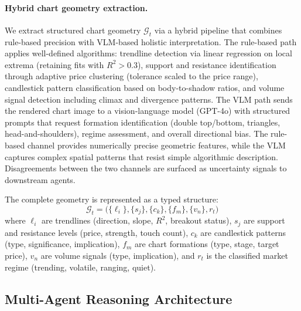 \paragraph{Hybrid chart geometry extraction.}
We extract structured chart geometry $\mathcal{G}_t$ via a hybrid pipeline that combines rule-based precision with VLM-based holistic interpretation. The rule-based path applies well-defined algorithms: trendline detection via linear regression on local extrema (retaining fits with $R^2 > 0.3$), support and resistance identification through adaptive price clustering (tolerance scaled to the price range), candlestick pattern classification based on body-to-shadow ratios, and volume signal detection including climax and divergence patterns. The VLM path sends the rendered chart image to a vision-language model (GPT-4o) with structured prompts that request formation identification (double top/bottom, triangles, head-and-shoulders), regime assessment, and overall directional bias. The rule-based channel provides numerically precise geometric features, while the VLM captures complex spatial patterns that resist simple algorithmic description. Disagreements between the two channels are surfaced as uncertainty signals to downstream agents.

The complete geometry is represented as a typed structure:
\begin{equation}
    \mathcal{G}_t = \big(\{\ell_i\}, \{s_j\}, \{c_k\}, \{f_m\}, \{v_n\}, r_t\big)
\end{equation}
where $\ell_i$ are trendlines (direction, slope, $R^2$, breakout status), $s_j$ are support and resistance levels (price, strength, touch count), $c_k$ are candlestick patterns (type, significance, implication), $f_m$ are chart formations (type, stage, target price), $v_n$ are volume signals (type, implication), and $r_t$ is the classified market regime (trending, volatile, ranging, quiet).

\subsection{Multi-Agent Reasoning Architecture}
\label{sec:agents}

